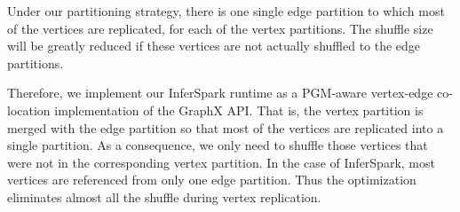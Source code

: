 Under our partitioning strategy, there is one single edge partition to which
most of the vertices are replicated, for each of the vertex partitions. The
shuffle size will be greatly reduced if these vertices are not actually
shuffled to the edge partitions.
%

Therefore, we implement our InferSpark runtime
as a PGM-aware vertex-edge co-location implementation of the GraphX API.
That is, the vertex partition is merged with the edge partition
so that most of the vertices are replicated into a single partition.
As a consequence,
we only need to shuffle those vertices that were not in the
corresponding vertex partition.
In the case of InferSpark, most vertices are referenced from only
one edge partition. Thus the optimization eliminates almost all the shuffle
during vertex replication.



%
%
%


